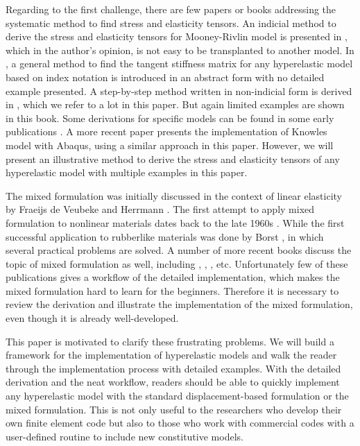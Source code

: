Regarding to the first challenge, there are few papers or books addressing the systematic method to find stress and elasticity tensors. An indicial method to derive the stress and elasticity tensors for Mooney-Rivlin model is presented in \cite{Bower}, which in the author's opinion, is not easy to be transplanted to another model. In \cite{Belytschko}, a general method to find the tangent stiffness matrix for any hyperelastic model based on index notation is introduced in an abstract form with no detailed example presented. A step-by-step method written in non-indicial form is derived in \cite{Holzapfel}, which we refer to a lot in this paper. But again limited examples are shown in this book. Some derivations for specific models can be found in some early publications \cite{Weiss, Nicholson}. A more recent paper \cite{Suchocki} presents the implementation of Knowles model with Abaqus, using a similar approach in this paper. However, we will present an illustrative method to derive the stress and elasticity tensors of any hyperelastic model with multiple examples in this paper.

The mixed formulation was initially discussed in the context of linear elasticity by Fraeijs de Veubeke \cite{Veubeke} and Herrmann \cite{Herrmann}. The first attempt to apply mixed formulation to nonlinear materials dates back to the late 1960s \cite{Oden}. While the first successful application to rubberlike materials was done by Borst \cite{Borst}, in which several practical problems are solved. A number of more recent books discuss the topic of mixed formulation as well, including \cite{Bathe}, \cite{Holzapfel}, \cite{Zienkiewicz}, etc. Unfortunately few of these publications gives a workflow of the detailed implementation, which makes the mixed formulation hard to learn for the beginners. Therefore it is necessary to review the derivation and illustrate the implementation of the mixed formulation, even though it is already well-developed.

This paper is motivated to clarify these frustrating problems. We will build a framework for the implementation of hyperelastic models and walk the reader through the implementation process with detailed examples. With the detailed derivation and the neat workflow, readers should be able to quickly implement any hyperelastic model with the standard displacement-based formulation or the mixed formulation. This is not only useful to the researchers who develop their own finite element code but also to those who work with commercial codes with a user-defined routine to include new constitutive models.

